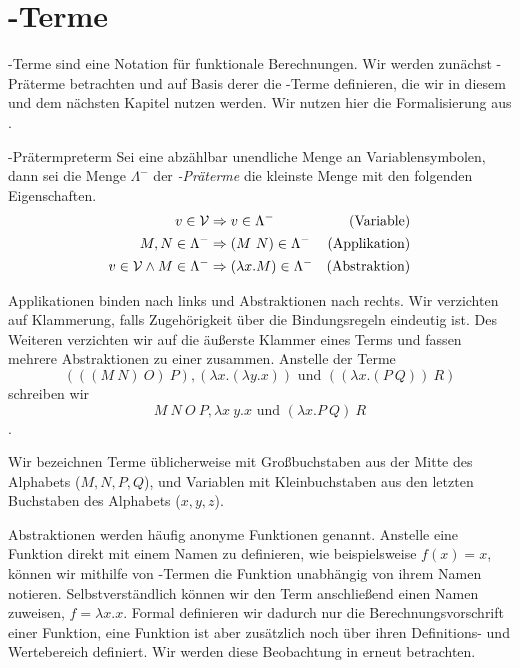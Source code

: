 \section{\tlambda-Terme}
\tlambda-Terme sind eine Notation für funktionale Berechnungen. Wir werden zunächst \tlambda-Präterme betrachten und auf Basis derer die \tlambda-Terme definieren, die wir in diesem und dem nächsten Kapitel nutzen werden. Wir nutzen hier die Formalisierung aus \cite{lecturesCH}.
\begin{definition}{\tlambda-Präterm}{preterm}
    Sei \V{} eine abzählbar unendliche Menge an Variablensymbolen, dann sei die Menge $\Lambda^-$ der \emph{\tlambda-Präterme} die kleinste Menge mit den folgenden Eigenschaften.
\begin{align*}
    v\in\mathcal{V}&\Rightarrow v\in\Lambda^- & (\text{Variable})\\
    M, N \in\Lambda^-&\Rightarrow (M~N)\in\Lambda^- & (\text{Applikation})\\
    v\in\mathcal{V}\land M\in\Lambda^-&\Rightarrow (\lambda x.M)\in\Lambda^- & (\text{Abstraktion})
\end{align*}
\end{definition}
\begin{notation}
    Applikationen binden nach links und Abstraktionen nach rechts. Wir verzichten auf Klammerung, falls Zugehörigkeit über die Bindungsregeln eindeutig ist. Des Weiteren verzichten wir auf die äußerste Klammer eines Terms und fassen mehrere Abstraktionen zu einer zusammen.
    Anstelle der Terme \[(((M~N)~O)~P), (\lambda x.(\lambda y.x))\text{ und }((\lambda x.(P~Q))~R)\] schreiben wir
    \[M~N~O~P, \lambda x~y.x\text{ und }(\lambda x.P~Q)~R\].
\end{notation}
\begin{convention}
    Wir bezeichnen Terme üblicherweise mit Großbuchstaben aus der Mitte des Alphabets (\zB $M,N,P,Q$), und Variablen mit Kleinbuchstaben aus den letzten Buchstaben des Alphabets (\zB $x,y,z$).
\end{convention}
\begin{remark}
    Abstraktionen werden häufig anonyme Funktionen genannt. Anstelle eine Funktion direkt mit einem Namen zu definieren, wie beispielsweise $f(x) = x$, können wir mithilfe von \tlambda-Termen die Funktion unabhängig von ihrem Namen notieren. Selbstverständlich können wir den Term anschließend einen Namen zuweisen, $f = \lambda x.x$. Formal definieren wir dadurch nur die Berechnungsvorschrift einer Funktion, eine Funktion ist aber zusätzlich noch über ihren Definitions- und Wertebereich definiert. Wir werden diese Beobachtung in  erneut betrachten.
\end{remark}
